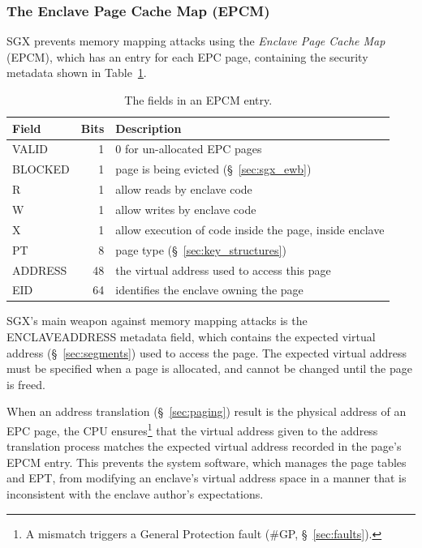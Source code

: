 \subsubsection{The Enclave Page Cache Map (EPCM)}
\label{sec:epcm}


SGX prevents memory mapping attacks using the \textit{Enclave Page Cache Map}
(EPCM), which has an entry for each EPC page, containing the security metadata
shown in Table~\ref{fig:epcm_entry}.

\begin{table}[hbt]
  \centering
  \begin{tabularx}{\columnwidth}{| l | r | X |}
  \hline
  \textbf{Field} & \textbf{Bits} & \textbf{Description}\\
  \hline
  VALID & 1 & 0 for un-allocated EPC pages \\
  \hline
  BLOCKED & 1 & page is being evicted (\S~\ref{sec:sgx_ewb})\\
  \hline
  R & 1 & allow reads by enclave code\\
  \hline
  W & 1 & allow writes by enclave code\\
  \hline
  X & 1 & allow execution of code inside the page, inside enclave\\
  \hline
  PT & 8 & page type (\S~\ref{sec:key_structures})\\
  \hline
  ADDRESS & 48 & the virtual address used to access this page\\
  \hline
  EID & 64 & identifies the enclave owning the page\\
  \hline
  \end{tabularx}
  \caption{
    The fields in an EPCM entry.
  }
  \label{fig:epcm_entry}
\end{table}


SGX's main weapon against memory mapping attacks is the ENCLAVEADDRESS metadata
field, which contains the expected virtual address (\S~\ref{sec:segments}) used
to access the page. The expected virtual address must be specified when a page
is allocated, and cannot be changed until the page is freed.

When an address translation (\S~\ref{sec:paging}) result is the physical
address of an EPC page, the CPU ensures\footnote{A mismatch triggers a General
Protection fault (\#GP, \S~\ref{sec:faults}).} that the virtual address given
to the address translation process matches the expected virtual address
recorded in the page's EPCM entry.  This prevents the system software, which
manages the page tables and EPT, from modifying an enclave's virtual address
space in a manner that is inconsistent with the enclave author's expectations.

